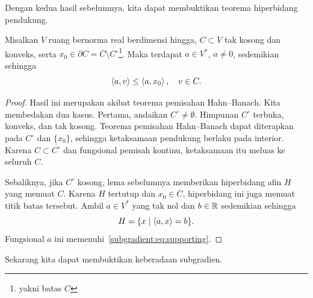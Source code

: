 Dengan kedua hasil sebelumnya, kita dapat membuktikan teorema hiperbidang pendukung.
\begin{theorem}
    Misalkan $V$ ruang bernorma real berdimensi hingga, $C\subset V$ tak kosong dan konveks, serta $x_0\in \partial C = \overline{C}\setminus C^\circ$\footnote{yakni batas $C$}. Maka terdapat $a\in V^*$, $a\neq 0$, sedemikian sehingga
    \begin{equation}\label{subgradient:eq:supporting}
        \left\langle a , v\right\rangle\leq \left\langle a , x_0\right\rangle,\quad v\in C.
    \end{equation}
\end{theorem}
\begin{proof}
    Hasil ini merupakan akibat teorema pemisahan Hahn--Banach. Kita membedakan dua kasus. Pertama, andaikan $C^\circ\neq \emptyset$. Himpunan $C^\circ$ terbuka, konveks, dan tak kosong. Teorema pemisahan Hahn--Banach dapat diterapkan pada $C^\circ$ dan $\{x_0\}$, sehingga ketaksamaan pendukung berlaku pada interior. Karena $C\subset\overline{C^\circ}$ dan fungsional pemisah kontinu, ketaksamaan itu meluas ke seluruh \(C\).

    Sebaliknya, jika $C^\circ$ kosong, lema sebelumnya memberikan hiperbidang afin $H$ yang memuat \(C\). Karena $H$ tertutup dan $x_0\in\overline C$, hiperbidang ini juga memuat titik batas tersebut. Ambil $a\in V^*$ yang tak nol dan $b\in\mathbb{R}$ sedemikian sehingga
    \[
        H=\{x\mid \left\langle a , x\right\rangle = b\}.
    \]
    Fungsional $a$ ini memenuhi~\eqref{subgradient:eq:supporting}.
\end{proof}

Sekarang kita dapat membuktikan keberadaan subgradien.

